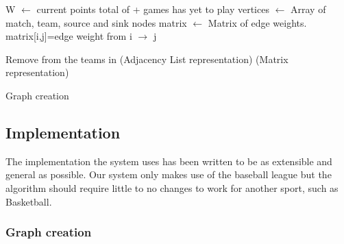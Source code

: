 \begin{algorithm}[H]
     
    
   
    
   
  W $\leftarrow$ current points total of \T + games \T has yet to play\;
  vertices $\leftarrow$ Array of match, team, source and sink nodes\;
  matrix $\leftarrow$ Matrix of edge weights. matrix[i,j]=edge weight from i $\rightarrow$ j\;

  \BlankLine
  Remove \T from the teams in \D\;
  \BlankLine
  \Begin(Adjacency List representation){
    }
    \Begin(Matrix representation){
      }
    \caption{Graph creation}\label{FFGRA}
\end{algorithm} \DecMargin{2em}

\subsection{Implementation}

The implementation the system uses has been written to be as extensible and
general as possible. Our system only makes use of the baseball league but the
algorithm should require little to no changes to work for another sport, such
as Basketball.

\subsubsection{Graph creation}

